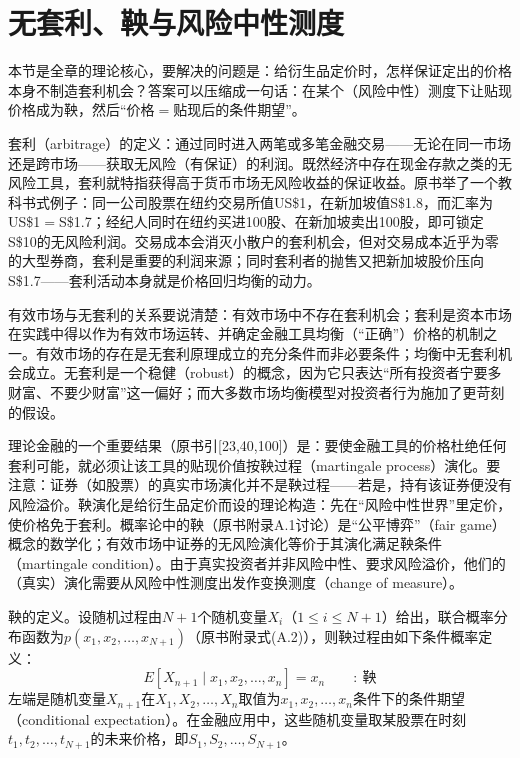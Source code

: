 \section{无套利、鞅与风险中性测度}

本节是全章的理论核心，要解决的问题是：给衍生品定价时，怎样保证定出的价格本身不制造套利机会？答案可以压缩成一句话：在某个（风险中性）测度下让贴现价格成为鞅，然后“价格$=$贴现后的条件期望”。

套利（arbitrage）的定义：通过同时进入两笔或多笔金融交易——无论在同一市场还是跨市场——获取无风险（有保证）的利润。既然经济中存在现金存款之类的无风险工具，套利就特指获得高于货币市场无风险收益的保证收益。原书举了一个教科书式例子：同一公司股票在纽约交易所值US\$1，在新加坡值S\$1.8，而汇率为US\$1$=$S\$1.7；经纪人同时在纽约买进100股、在新加坡卖出100股，即可锁定S\$10的无风险利润。交易成本会消灭小散户的套利机会，但对交易成本近乎为零的大型券商，套利是重要的利润来源；同时套利者的抛售又把新加坡股价压向S\$1.7——套利活动本身就是价格回归均衡的动力。

有效市场与无套利的关系要说清楚：有效市场中不存在套利机会；套利是资本市场在实践中得以作为有效市场运转、并确定金融工具均衡（“正确”）价格的机制之一。有效市场的存在是无套利原理成立的充分条件而非必要条件；均衡中无套利机会成立。无套利是一个稳健（robust）的概念，因为它只表达“所有投资者宁要多财富、不要少财富”这一偏好；而大多数市场均衡模型对投资者行为施加了更苛刻的假设。

理论金融的一个重要结果（原书引[23,40,100]）是：要使金融工具的价格杜绝任何套利可能，就必须让该工具的贴现价值按鞅过程（martingale process）演化。要注意：证券（如股票）的真实市场演化并不是鞅过程——若是，持有该证券便没有风险溢价。鞅演化是给衍生品定价而设的理论构造：先在“风险中性世界”里定价，使价格免于套利。概率论中的鞅（原书附录A.1讨论）是“公平博弈”（fair game）概念的数学化；有效市场中证券的无风险演化等价于其演化满足鞅条件（martingale condition）。由于真实投资者并非风险中性、要求风险溢价，他们的（真实）演化需要从风险中性测度出发作变换测度（change of measure）。

鞅的定义。设随机过程由$N+1$个随机变量$X_i$（$1\le i\le N+1$）给出，联合概率分布函数为$p(x_1,x_2,\ldots,x_{N+1})$（原书附录式(A.2)），则鞅过程由如下条件概率定义：
\begin{equation*}
E\!\left[X_{n+1}\mid x_1,x_2,\ldots,x_n\right]=x_n
\qquad:\ \text{鞅}
\tag{2.2}
\end{equation*}
左端是随机变量$X_{n+1}$在$X_1,X_2,\ldots,X_n$取值为$x_1,x_2,\ldots,x_n$条件下的条件期望（conditional expectation）。在金融应用中，这些随机变量取某股票在时刻$t_1,t_2,\ldots,t_{N+1}$的未来价格，即$S_1,S_2,\ldots,S_{N+1}$。

